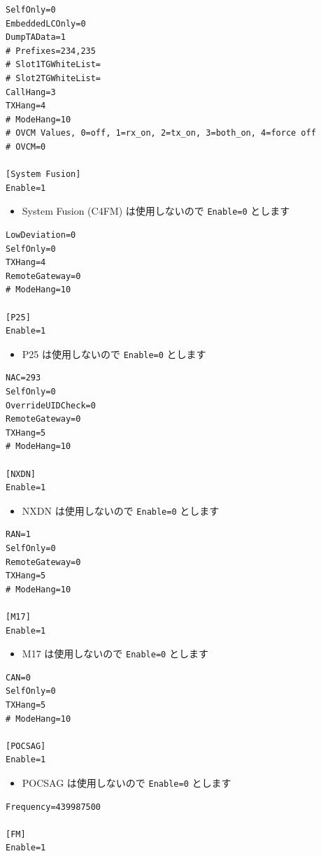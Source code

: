 \documentclass[a4j,oneside]{ujbook}
\begin{document}
\begin{verbatim}
SelfOnly=0
EmbeddedLCOnly=0
DumpTAData=1
# Prefixes=234,235
# Slot1TGWhiteList=
# Slot2TGWhiteList=
CallHang=3
TXHang=4
# ModeHang=10
# OVCM Values, 0=off, 1=rx_on, 2=tx_on, 3=both_on, 4=force off
# OVCM=0

[System Fusion]
Enable=1
\end{verbatim}
\begin{itemize}
 \renewcommand{\labelitemi}{$\triangleright$}
 \item System Fusion (C4FM) は使用しないので \verb+Enable=0+ とします
\end{itemize}
\begin{verbatim}
LowDeviation=0
SelfOnly=0
TXHang=4
RemoteGateway=0
# ModeHang=10

[P25]
Enable=1
\end{verbatim}
\begin{itemize}
 \renewcommand{\labelitemi}{$\triangleright$}
 \item P25 は使用しないので \verb+Enable=0+ とします
\end{itemize}
\begin{verbatim}
NAC=293
SelfOnly=0
OverrideUIDCheck=0
RemoteGateway=0
TXHang=5
# ModeHang=10

[NXDN]
Enable=1
\end{verbatim}
\begin{itemize}
 \renewcommand{\labelitemi}{$\triangleright$}
 \item NXDN は使用しないので \verb+Enable=0+ とします
\end{itemize}
\begin{verbatim}
RAN=1
SelfOnly=0
RemoteGateway=0
TXHang=5
# ModeHang=10

[M17]
Enable=1
\end{verbatim}
\begin{itemize}
 \renewcommand{\labelitemi}{$\triangleright$}
 \item M17 は使用しないので \verb+Enable=0+ とします
\end{itemize}
\begin{verbatim}
CAN=0
SelfOnly=0
TXHang=5
# ModeHang=10

[POCSAG]
Enable=1
\end{verbatim}
\begin{itemize}
 \renewcommand{\labelitemi}{$\triangleright$}
 \item POCSAG は使用しないので \verb+Enable=0+ とします
\end{itemize}
\begin{verbatim}
Frequency=439987500

[FM]
Enable=1
\end{verbatim}
\end{document}
